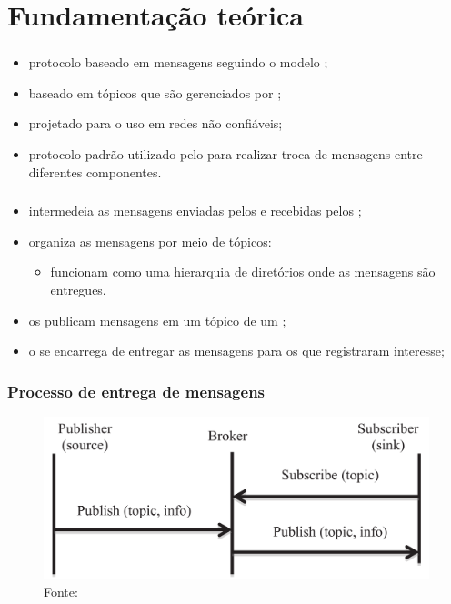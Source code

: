\documentclass[aspectratio=169]{beamer}
\begin{document}
\section{Fundamentação teórica}


\begin{frame}
	\frametitle{\mqtt}
	\begin{itemize}
		\item protocolo baseado em mensagens seguindo o modelo \pubsub;

			\bigskip

		\item baseado em tópicos que são gerenciados por \brokers;

			\bigskip

		\item projetado para o uso em redes não confiáveis;

			\bigskip

		\item protocolo padrão utilizado pelo \cddl para realizar troca de mensagens entre diferentes componentes.
	\end{itemize}
\end{frame}

\begin{frame}
	\frametitle{\Broker}
	\begin{itemize}
		\item intermedeia as mensagens enviadas pelos \pubs e recebidas pelos \subs;

		\item organiza as mensagens por meio de tópicos:
		\begin{itemize}
			\item funcionam como uma hierarquia de diretórios onde as mensagens são entregues.
		\end{itemize}

		\item os \pubs publicam mensagens em um tópico de um \broker;

		\item o \broker se encarrega de entregar as mensagens para os \subs que registraram interesse;
	\end{itemize}
\end{frame}

\begin{frame}
	\frametitle{Processo de entrega de mensagens \mqtt}
	\begin{figure}
		\centering
		\includegraphics[width=.70\linewidth]{img/mqtt-sequence.png}
		\caption{Fonte:\cite{al-fuqaha:et-al:2015}}
	\end{figure}
\end{frame}
\end{document}
